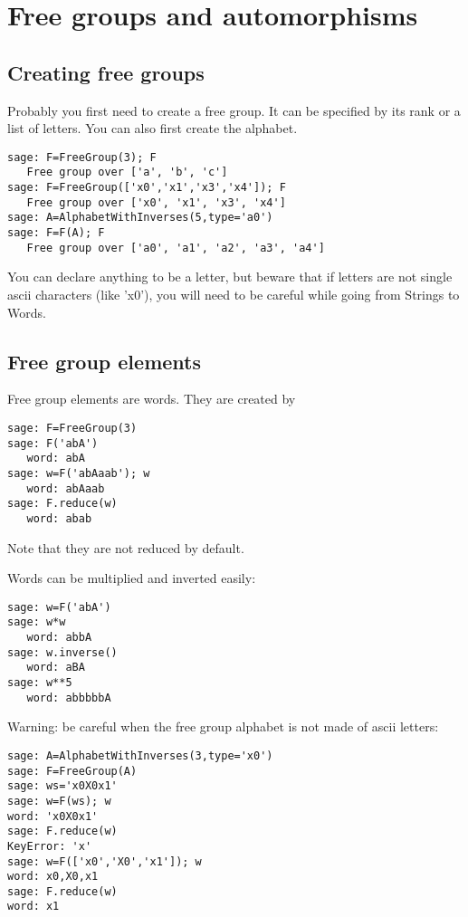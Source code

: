 \documentclass[10pt,a4paper]{article}
\begin{document}
\section{Free groups and automorphisms}

\subsection{Creating free groups}

Probably you first need to create a free group. It can be specified by
its rank or a list of letters. You can also first create the alphabet.
\begin{verbatim}
sage: F=FreeGroup(3); F
   Free group over ['a', 'b', 'c']
sage: F=FreeGroup(['x0','x1','x3','x4']); F
   Free group over ['x0', 'x1', 'x3', 'x4']
sage: A=AlphabetWithInverses(5,type='a0')
sage: F=F(A); F
   Free group over ['a0', 'a1', 'a2', 'a3', 'a4']
\end{verbatim}
You can declare anything to be a letter, but beware that if letters are
not single ascii characters (like 'x0'), you will need to be careful
while going from Strings to Words.

\subsection{Free group elements}

Free group elements are words. They are created by
\begin{verbatim}
sage: F=FreeGroup(3)
sage: F('abA')
   word: abA
sage: w=F('abAaab'); w
   word: abAaab
sage: F.reduce(w)
   word: abab
\end{verbatim} 
Note that they are not reduced by default. 

Words can be multiplied and inverted easily:

\begin{verbatim}
sage: w=F('abA')
sage: w*w
   word: abbA
sage: w.inverse()
   word: aBA
sage: w**5
   word: abbbbbA
\end{verbatim}

Warning: be careful when the free group alphabet is not made of ascii letters:

\begin{verbatim}
sage: A=AlphabetWithInverses(3,type='x0')
sage: F=FreeGroup(A)
sage: ws='x0X0x1'
sage: w=F(ws); w
word: 'x0X0x1'
sage: F.reduce(w)
KeyError: 'x'
sage: w=F(['x0','X0','x1']); w
word: x0,X0,x1
sage: F.reduce(w)
word: x1
\end{verbatim}
\end{document}
